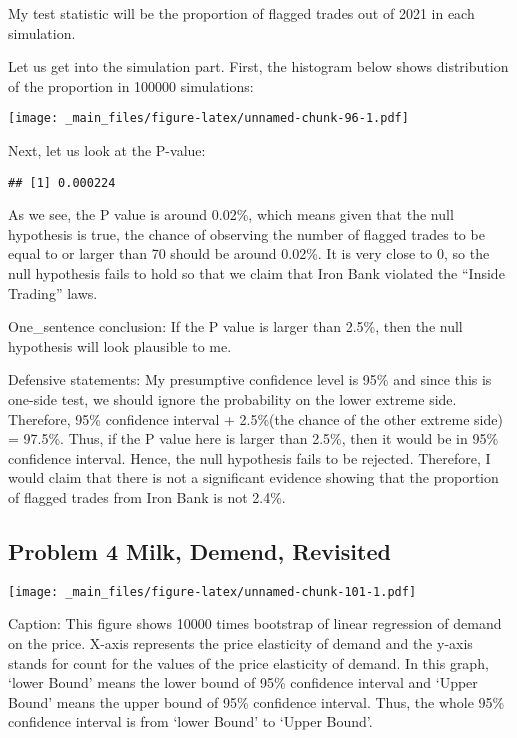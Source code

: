 \documentclass[
]{article}
\begin{document}
My test statistic will be the proportion of flagged trades out of 2021 in each simulation.

Let us get into the simulation part. First, the histogram below shows distribution of the proportion in 100000 simulations:

\texttt{[image: \_main\_files/figure-latex/unnamed-chunk-96-1.pdf]}

Next, let us look at the P-value:

\begin{verbatim}
## [1] 0.000224
\end{verbatim}

As we see, the P value is around 0.02\%, which means given that the null hypothesis is true, the chance of observing the number of flagged trades to be equal to or larger than 70 should be around 0.02\%. It is very close to 0, so the null hypothesis fails to hold so that we claim that Iron Bank violated the ``Inside Trading'' laws.

One\_sentence conclusion: If the P value is larger than 2.5\%, then the null hypothesis will look plausible to me.

Defensive statements: My presumptive confidence level is 95\% and since this is one-side test, we should ignore the probability on the lower extreme side. Therefore, 95\% confidence interval + 2.5\%(the chance of the other extreme side) = 97.5\%. Thus, if the P value here is larger than 2.5\%, then it would be in 95\% confidence interval. Hence, the null hypothesis fails to be rejected. Therefore, I would claim that there is not a significant evidence showing that the proportion of flagged trades from Iron Bank is not 2.4\%.

\hypertarget{problem-4-milk-demend-revisited}{%
\subsection{Problem 4 Milk, Demend, Revisited}\label{problem-4-milk-demend-revisited}}

\texttt{[image: \_main\_files/figure-latex/unnamed-chunk-101-1.pdf]}

Caption: This figure shows 10000 times bootstrap of linear regression of demand on the price. X-axis represents the price elasticity of demand and the y-axis stands for count for the values of the price elasticity of demand. In this graph, `lower Bound' means the lower bound of 95\% confidence interval and `Upper Bound' means the upper bound of 95\% confidence interval. Thus, the whole 95\% confidence interval is from `lower Bound' to `Upper Bound'.
\end{document}
